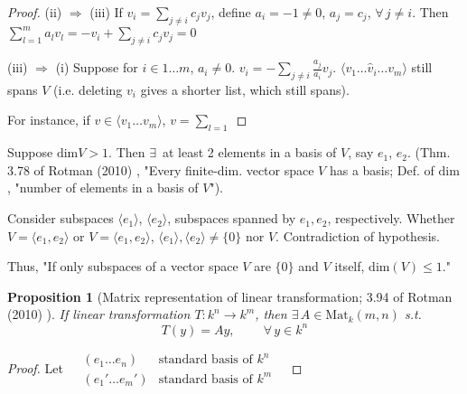 \documentclass[10pt]{amsart}
\newtheorem{proposition}{Proposition}
\newcommand{\exercisehead}[1]
  { \smallskip
   \noindent{\small\bf Exercise #1.}
  }
\begin{document}
\begin{multicols*}{2}
\begin{proof}
(ii) $\Longrightarrow$ (iii) If $v_i = \sum_{j\neq i} c_j v_j$, define $a_i  = -1 \neq 0$, $a_j = c_j$, $\forall \, j \neq i$.  Then $\sum_{l=1}^m a_l v_l = -v_i + \sum_{j\neq i } c_j v_j = 0$

(iii) $\Longrightarrow$ (i) Suppose for $i \in 1 \dots m$, $a_i \neq 0$.  $v_i = -\sum_{j\neq i} \frac{a_j}{a_i} v_j$.  $\langle v_1 \dots \widehat{v}_i \dots v_m\rangle$ still spans $V$ (i.e. deleting $v_i$ gives a shorter list, which still spans).  

For instance, if $v\in \langle v_1 \dots v_m \rangle$, $v= \sum_{l=1}$%





	\end{proof}

\exercisehead{3.67} Suppose $\text{dim}V >1$. Then $\exists \, $ at least 2 elements in a basis of $V$, say $e_1$, $e_2$. (Thm. 3.78 of Rotman (2010) \cite{JRotman2010}, "Every finite-dim. vector space $V$ has a basis; Def. of $\text{dim}$, "number of elements in a basis of $V$").   

Consider subspaces $\langle e_1 \rangle$, $\langle e_2 \rangle$, subspaces spanned by $e_1,e_2$, respectively. Whether $V= \langle e_1, e_2 \rangle$ or $V= \langle e_1, e_2\rangle$, $\langle e_1 \rangle , \langle e_2 \rangle \neq \lbrace 0 \rbrace$ nor $V$. Contradiction of hypothesis.  

Thus, "If only subspaces of a vector space $V$ are $\lbrace 0 \rbrace$ and $V$ itself, $\text{dim}(V) \leq 1$."



\begin{proposition}[Matrix representation of linear transformation; 3.94 of Rotman (2010) \cite{JRotman2010}]\label{Prop:MatRepofLinearTransform}
	If linear transformation $T: k^n \to k^m$, then $\exists \,  A \in \text{Mat}_k(m,n)$ s.t. 
	\[
	T(y) = Ay, \qquad \  \forall \, y \in k^n
	\]
\end{proposition}

\begin{proof}
	Let $\begin{aligned} & (e_1\dots e_n) & \text{standard basis of $k^n$ }   \\
	& (e_1' \dots e_m') & \text{standard basis of $k^m$ }  \end{aligned}$


\end{proof}
\end{multicols*}
\end{document}
